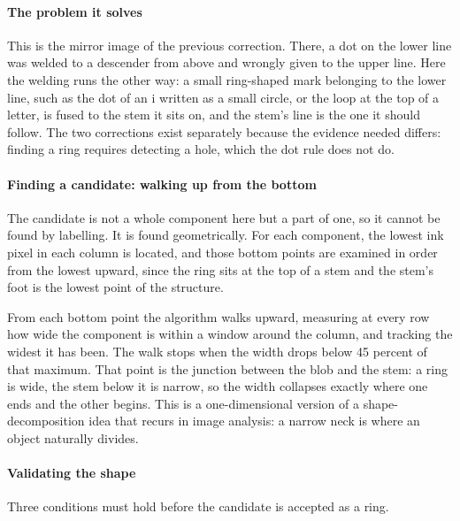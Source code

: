 \paragraph{The problem it solves}
This is the mirror image of the previous correction. There, a dot on the lower line was welded to a descender from above and wrongly given to the upper line. Here the welding runs the other way: a small ring-shaped mark belonging to the lower line, such as the dot of an i written as a small circle, or the loop at the top of a letter, is fused to the stem it sits on, and the stem's line is the one it should follow. The two corrections exist separately because the evidence needed differs: finding a ring requires detecting a hole, which the dot rule does not do.


\paragraph{Finding a candidate: walking up from the bottom}
The candidate is not a whole component here but a part of one, so it cannot be found by labelling. It is found geometrically. For each component, the lowest ink pixel in each column is located, and those bottom points are examined in order from the lowest upward, since the ring sits at the top of a stem and the stem's foot is the lowest point of the structure.

From each bottom point the algorithm walks upward, measuring at every row how wide the component is within a window around the column, and tracking the widest it has been. The walk stops when the width drops below 45 percent of that maximum. That point is the junction between the blob and the stem: a ring is wide, the stem below it is narrow, so the width collapses exactly where one ends and the other begins. This is a one-dimensional version of a shape-decomposition idea that recurs in image analysis: a narrow neck is where an object naturally divides.


\paragraph{Validating the shape}
Three conditions must hold before the candidate is accepted as a ring.


